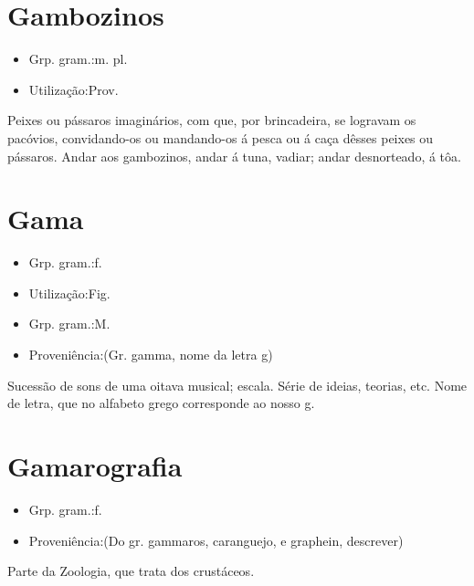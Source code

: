 \section{Gambozinos}
\begin{itemize}
\item {Grp. gram.:m. pl.}
\end{itemize}
\begin{itemize}
\item {Utilização:Prov.}
\end{itemize}
Peixes ou pássaros imaginários, com que, por brincadeira, se logravam os pacóvios, convidando-os ou mandando-os á pesca ou á caça dêsses peixes ou pássaros.
\textunderscore Andar aos gambozinos\textunderscore , andar á tuna, vadiar; andar desnorteado, á tôa.
\section{Gama}
\begin{itemize}
\item {Grp. gram.:f.}
\end{itemize}
\begin{itemize}
\item {Utilização:Fig.}
\end{itemize}
\begin{itemize}
\item {Grp. gram.:M.}
\end{itemize}
\begin{itemize}
\item {Proveniência:(Gr. \textunderscore gamma\textunderscore , nome da letra \textunderscore g\textunderscore )}
\end{itemize}
Sucessão de sons de uma oitava musical; escala.
Série de ideias, teorias, etc.
Nome de letra, que no alfabeto grego corresponde ao nosso \textunderscore g\textunderscore .
\section{Gamarografia}
\begin{itemize}
\item {Grp. gram.:f.}
\end{itemize}
\begin{itemize}
\item {Proveniência:(Do gr. \textunderscore gammaros\textunderscore , caranguejo, e \textunderscore graphein\textunderscore , descrever)}
\end{itemize}
Parte da Zoologia, que trata dos crustáceos.
